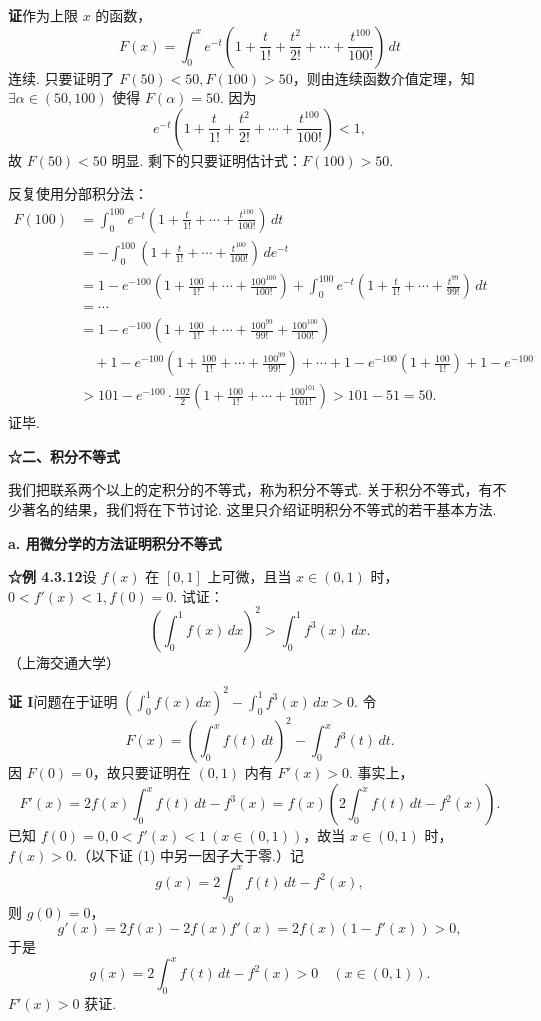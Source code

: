 \documentclass[UTF8,12pt,a4paper,fontset=fandol]{ctexart}
\begin{document}
\noindent\textbf{证}\quad 作为上限 $x$ 的函数，
\[
F(x)=\int_0^x e^{-t}\left(1+\frac{t}{1!}+\frac{t^2}{2!}+\cdots+\frac{t^{100}}{100!}\right)\,dt
\]
连续. 只要证明了 $F(50)<50,F(100)>50$，则由连续函数介值定理，知 $\exists\alpha\in(50,100)$ 使得 $F(\alpha)=50$. 因为
\[
e^{-t}\left(1+\frac{t}{1!}+\frac{t^2}{2!}+\cdots+\frac{t^{100}}{100!}\right)<1,
\]
故 $F(50)<50$ 明显. 剩下的只要证明估计式：$F(100)>50$.

反复使用分部积分法：
\[
\begin{aligned}
F(100)
&=\int_0^{100}e^{-t}\left(1+\frac{t}{1!}+\cdots+\frac{t^{100}}{100!}\right)\,dt\\
&=-\int_0^{100}\left(1+\frac{t}{1!}+\cdots+\frac{t^{100}}{100!}\right)\,de^{-t}\\
&=1-e^{-100}\left(1+\frac{100}{1!}+\cdots+\frac{100^{100}}{100!}\right)
+\int_0^{100}e^{-t}\left(1+\frac{t}{1!}+\cdots+\frac{t^{99}}{99!}\right)\,dt\\
&=\cdots\\
&=1-e^{-100}\left(1+\frac{100}{1!}+\cdots+\frac{100^{99}}{99!}+\frac{100^{100}}{100!}\right)\\
&\quad+1-e^{-100}\left(1+\frac{100}{1!}+\cdots+\frac{100^{99}}{99!}\right)+\cdots
+1-e^{-100}\left(1+\frac{100}{1!}\right)+1-e^{-100}\\
&>101-e^{-100}\cdot\frac{102}{2}
\left(1+\frac{100}{1!}+\cdots+\frac{100^{101}}{101!}\right)>101-51=50.
\end{aligned}
\]
证毕.

\noindent\textbf{☆二、积分不等式}

我们把联系两个以上的定积分的不等式，称为积分不等式. 关于积分不等式，有不少著名的结果，我们将在下节讨论. 这里只介绍证明积分不等式的若干基本方法.

\noindent\textbf{a. 用微分学的方法证明积分不等式}

\noindent\textbf{☆例 4.3.12}\quad 设 $f(x)$ 在 $[0,1]$ 上可微，且当 $x\in(0,1)$ 时，$0<f'(x)<1,f(0)=0$. 试证：
\[
\left(\int_0^1 f(x)\,dx\right)^2>\int_0^1 f^3(x)\,dx.
\]
（上海交通大学）

\noindent\textbf{证 I}\quad 问题在于证明 $\left(\int_0^1 f(x)\,dx\right)^2-\int_0^1 f^3(x)\,dx>0$. 令
\[
F(x)=\left(\int_0^x f(t)\,dt\right)^2-\int_0^x f^3(t)\,dt.
\]
因 $F(0)=0$，故只要证明在 $(0,1)$ 内有 $F'(x)>0$. 事实上，
\[
F'(x)=2f(x)\int_0^x f(t)\,dt-f^3(x)
=f(x)\left(2\int_0^x f(t)\,dt-f^2(x)\right).
\tag{1}
\]
已知 $f(0)=0,0<f'(x)<1\ (x\in(0,1))$，故当 $x\in(0,1)$ 时，$f(x)>0$.（以下证 (1) 中另一因子大于零.）记
\[
g(x)=2\int_0^x f(t)\,dt-f^2(x),
\]
则 $g(0)=0$，
\[
g'(x)=2f(x)-2f(x)f'(x)=2f(x)(1-f'(x))>0,
\]
于是
\[
g(x)=2\int_0^x f(t)\,dt-f^2(x)>0\quad(x\in(0,1)).
\]
$F'(x)>0$ 获证.
\end{document}
